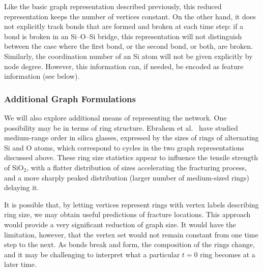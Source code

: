 Like the basic graph representation described previously, this reduced representation keeps the number of vertices constant.  On the other hand, it does not explicitly track bonds that are formed and broken at each time step: if a bond is broken in an Si--O--Si bridge, this representation will not distinguish between the case where the first bond, or the second bond, or both, are broken.  Similarly, the coordination number of an Si atom will not be given explicitly by node degree.  However, this information can, if needed, be encoded as feature information (see below).

\subsubsection{Additional Graph Formulations}

We will also explore additional means of representing the network.  One possibility may be in terms of ring structure.  Ebrahem et al.~\cite{ebrahem2018influence} have studied medium-range order in silica glasses, expressed by the sizes of rings of alternating Si and O atoms, which correspond to cycles in the two graph representations discussed above.  These ring size statistics appear to influence the tensile strength of SiO$_2$, with a flatter distribution of sizes accelerating the fracturing process, and a more sharply peaked distribution (larger number of medium-sized rings) delaying it.

It is possible that, by letting vertices represent rings with vertex labels describing ring size, we may obtain useful predictions of fracture locations. This approach would provide a very significant reduction of graph size.  It would have the limitation, however, that the vertex set would not remain constant from one time step to the next.  As bonds break and form, the composition of the rings change, and it may be challenging to interpret what a particular $t=0$ ring becomes at a later time.


